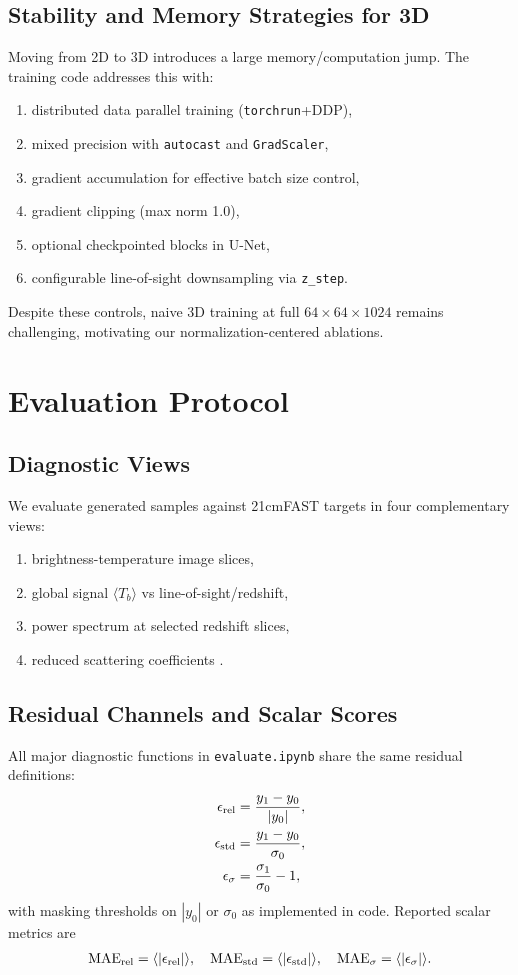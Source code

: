 \documentclass{aastex631}
\begin{document}
\subsection{Stability and Memory Strategies for 3D}
Moving from 2D to 3D introduces a large memory/computation jump. The training code addresses this with:
\begin{enumerate}
    \item distributed data parallel training (\texttt{torchrun}+DDP),
    \item mixed precision with \texttt{autocast} and \texttt{GradScaler},
    \item gradient accumulation for effective batch size control,
    \item gradient clipping (max norm 1.0),
    \item optional checkpointed blocks in U-Net,
    \item configurable line-of-sight downsampling via \texttt{z\_step}.
\end{enumerate}
Despite these controls, naive 3D training at full $64\times64\times1024$ remains challenging, motivating our normalization-centered ablations.

\section{Evaluation Protocol}
\subsection{Diagnostic Views}
We evaluate generated samples against 21cmFAST targets in four complementary views:
\begin{enumerate}
    \item brightness-temperature image slices,
    \item global signal $\langle T_b\rangle$ vs line-of-sight/redshift,
    \item power spectrum at selected redshift slices,
    \item reduced scattering coefficients \citep{andreux2020kymatio,2023MNRAS.519.5288G}.
\end{enumerate}

\subsection{Residual Channels and Scalar Scores}
All major diagnostic functions in \texttt{evaluate.ipynb} share the same residual definitions:
\begin{align}
\epsilon_{\rm rel} &= \frac{y_1-y_0}{|y_0|}, \\
\epsilon_{\rm std} &= \frac{y_1-y_0}{\sigma_0}, \\
\epsilon_{\sigma} &= \frac{\sigma_1}{\sigma_0}-1,
\end{align}
with masking thresholds on $|y_0|$ or $\sigma_0$ as implemented in code. Reported scalar metrics are
\begin{align}
\mathrm{MAE}_{\rm rel}=\langle|\epsilon_{\rm rel}|\rangle,\quad
\mathrm{MAE}_{\rm std}=\langle|\epsilon_{\rm std}|\rangle,\quad
\mathrm{MAE}_{\sigma}=\langle|\epsilon_{\sigma}|\rangle.
\end{align}
\end{document}
